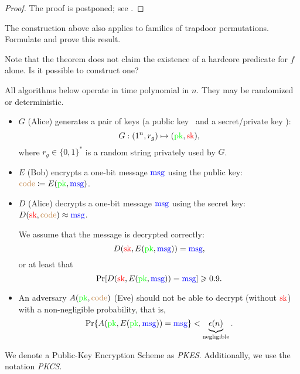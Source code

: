 \begin{proof}
    The proof is postponed; see .
\end{proof}

\begin{exercise}
    The construction above also applies to families of trapdoor permutations.
    Formulate and prove this result.
\end{exercise}

\begin{problem}
    Note that the theorem does not claim the existence of a hardcore predicate for $f$ alone.
    Is it possible to construct one?
\end{problem}

\begin{algorithm}
All algorithms below operate in time polynomial in $n$.
They may be randomized or deterministic.

\begin{itemize}
    \item $G$ (Alice) generates a pair of keys (a public key \pk\ and a secret/private key \sk):
    \[
    G: (1^n, r_g) \mapsto (\textcolor{green}{\text{pk}}, \textcolor{red}{\text{sk}}),
    \]
    where $r_g \in \{0,1\}^*$ is a random string privately used by $G$.
    \item $E$ (Bob) encrypts a one-bit message $\textcolor{blue}{\text{msg}}$ using the public key: $\textcolor{brown}{\text{code}} \coloneqq E(\textcolor{green}{\text{pk}}, \textcolor{blue}{\text{msg}})$.
    \item $D$ (Alice) decrypts a one-bit message $\textcolor{blue}{\text{msg}}$ using the secret key: $D(\textcolor{red}{\text{sk}}, \textcolor{brown}{\text{code}}) \approx \textcolor{blue}{\text{msg}}$.
    
    We assume that the message is decrypted correctly:
    \[
    D(\textcolor{red}{\text{sk}}, E(\textcolor{green}{\text{pk}}, \textcolor{blue}{\text{msg}})) = \textcolor{blue}{\text{msg}},
    \]
    or at least that
    \[
        \Pr[ D(\textcolor{red}{\text{sk}}, E(\textcolor{green}{\text{pk}}, \textcolor{blue}{\text{msg}})) = \textcolor{blue}{\text{msg}} ] \geqslant 0.9.
    \]
    \item An adversary $A(\textcolor{green}{\text{pk}}, \textcolor{brown}{\text{code}})$ (Eve) should not be able to decrypt (without $\textcolor{red}{\text{sk}}$) with a non-negligible probability, that is,
    \[
        \Pr\{ A(\textcolor{green}{\text{pk}}, E(\textcolor{green}{\text{pk}}, \textcolor{blue}{\text{msg}})) = \textcolor{blue}{\text{msg}} \} < \underbrace{\epsilon(n)}_{\text{negligible}}.
    \]
\end{itemize}
\end{algorithm}

We denote a Public-Key Encryption Scheme as \emph{PKES}.
Additionally, we use the notation \emph{PKCS}.


